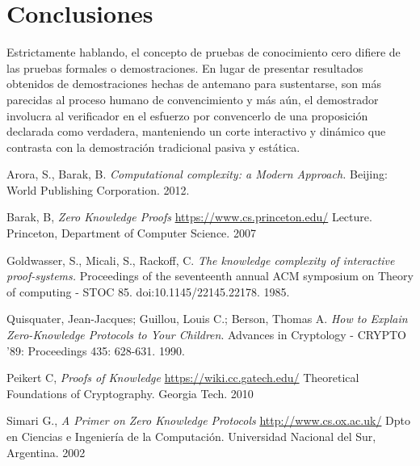 \documentclass[oneside,10pt]{article}
\begin{document}
\section{Conclusiones}
  Estrictamente hablando, el concepto de  pruebas de conocimiento cero difiere de las pruebas formales o demostraciones. En lugar de presentar resultados obtenidos de demostraciones hechas de antemano para
  sustentarse, son más parecidas al proceso humano de convencimiento y más aún, el demostrador
  involucra al verificador en el esfuerzo por convencerlo de una proposición declarada como verdadera, manteniendo un corte interactivo y dinámico que contrasta con la demostración tradicional pasiva y estática. 
\begin{thebibliography}{99}

  Arora, S.,  Barak, B. 
  \emph{Computational complexity: a Modern Approach.}
  Beijing: World Publishing Corporation.
  2012.

  Barak, B,
  \emph{Zero Knowledge Proofs}
  \href{https://www.cs.princeton.edu/courses/archive/fall07/cos433/lec15.pdf}
       {https://www.cs.princeton.edu/}
       Lecture.
       Princeton, Department of Computer Science.
       2007

  Goldwasser, S., Micali, S.,  Rackoff, C.
  \emph{The knowledge complexity of interactive proof-systems.}
  Proceedings of the seventeenth annual ACM symposium on Theory of computing - STOC 85.
  doi:10.1145/22145.22178.
  1985.

  Quisquater, Jean-Jacques; Guillou, Louis C.; Berson, Thomas A.
  \emph{How to Explain Zero-Knowledge Protocols to Your Children}.
  Advances in Cryptology - CRYPTO '89:
  Proceedings 435: 628-631.
  1990.

  Peikert C,
  \emph{Proofs of Knowledge}
  \href{https://wiki.cc.gatech.edu/theory/images/5/54/Lec18.pdf}
  {https://wiki.cc.gatech.edu/}
  Theoretical Foundations of Cryptography.
  Georgia Tech.
  2010

  Simari G.,
  \emph{A Primer on Zero Knowledge Protocols}
  \href{http://www.cs.ox.ac.uk/people/gerardo.simari/personal/publications/zkp-simari2002.pdf}
       {http://www.cs.ox.ac.uk/}
       Dpto en Ciencias e Ingeniería de la Computación.
       Universidad Nacional del Sur, Argentina.
       2002
\end{thebibliography}
\end{document}
